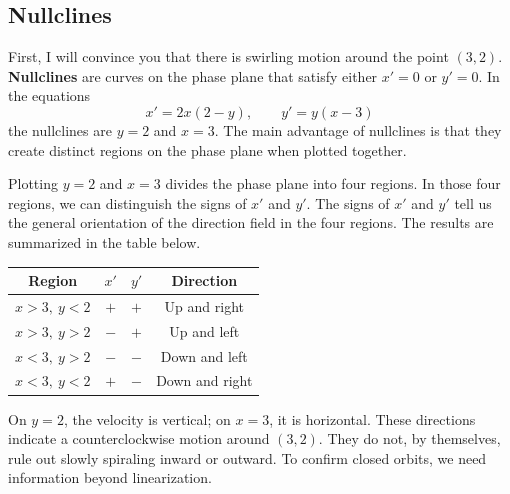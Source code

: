 \documentclass[10pt,letterpaper]{article}
\begin{document}

\subsection{Nullclines}

First, I will convince you that there is swirling motion around the point $(3,2)$.
\textbf{Nullclines} are curves on the phase plane that satisfy either $x'=0$ or $y'=0$.
In the equations
\[
x'=2x(2-y),\qquad y'=y(x-3)
\]
the nullclines are $y=2$ and $x=3$. The main advantage of nullclines is that they create distinct regions on the phase plane when plotted together.

Plotting $y=2$ and $x=3$ divides the phase plane into four regions. In those four regions, we can distinguish the signs of $x'$ and $y'$. The signs of $x'$ and $y'$ tell us the general orientation of the direction field in the four regions. The results are summarized in the table below.
\begin{center}
\renewcommand{\arraystretch}{1.2}
\begin{tabular}{c|c|c|c}
Region & $x'$ & $y'$ & Direction\\\hline
$x>3,\ y<2$ & $+$ & $+$ & Up and right\\
$x>3,\ y>2$ & $-$ & $+$ & Up and left\\
$x<3,\ y>2$ & $-$ & $-$ & Down and left\\
$x<3,\ y<2$ & $+$ & $-$ & Down and right
\end{tabular}
\quad
{}
\end{center}
On $y=2$, the velocity is vertical; on $x=3$, it is horizontal.
These directions indicate a counterclockwise motion around $(3,2)$.
They do not, by themselves, rule out slowly spiraling inward or outward.
To confirm closed orbits, we need information beyond linearization.
\end{document}
